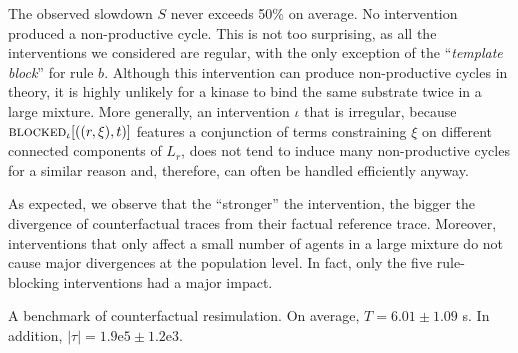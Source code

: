 The observed slowdown $S$ never exceeds 50\% on average. No intervention
produced a non-productive cycle. This is not too surprising, as all the
interventions we considered are regular, with the only exception of the
``\textit{template block}'' for rule $b$. Although this intervention can produce
non-productive cycles in theory, it is highly unlikely for a kinase to bind the same substrate twice in a large mixture. More
generally, an intervention $\iota$ that is irregular, because
${\textsc{blocked}}_{\iota}[((r, \xi), t)]$ features a conjunction of terms constraining
$\xi$ on different connected components of $L_r$, does not tend to induce many
non-productive cycles for a similar reason and, therefore, can often be handled
efficiently anyway.

As expected, we observe that the ``stronger'' the intervention, the bigger the divergence of counterfactual traces from their factual reference trace. Moreover, interventions that only affect a small number of
agents in a large mixture do not cause major divergences at the population level. In fact, only the five rule-blocking interventions had a major impact.



 \begin{table}\footnotesize
  \begin{center}
    
  \end{center}
  \caption{
A benchmark of counterfactual resimulation. On average,
    $T = 6.01\pm 1.09$ s.  In addition,
    $|\tau| = 1.9\mathrm{e}5 \pm 1.2\mathrm{e}3$.}\label{tab:bench}
\end{table}
